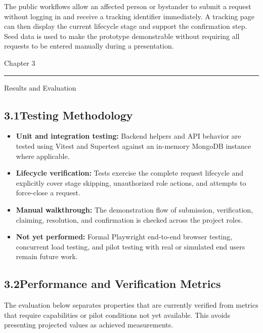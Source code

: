 \documentclass[11pt,a4paper]{article}
\newcommand{\chaptertitle}[2]{%
  \vspace*{0pt}%
  {\normalfont\fontsize{22}{25}\selectfont #1\par}%
  \vspace{2pt}%
  \noindent\rule{\textwidth}{0.7pt}\par
  \vspace{7pt}%
  {\normalfont\fontsize{22}{25}\selectfont #2\par}
  \vspace{5pt}%
}
\begin{document}
The public workflows allow an affected person or bystander to submit a request without logging in and receive a tracking identifier immediately. A tracking page can then display the current lifecycle stage and support the confirmation step. Seed data is used to make the prototype demonstrable without requiring all requests to be entered manually during a presentation.

\newpage

\chaptertitle{Chapter 3}{Results and Evaluation}

\subsection{3.1\quad Testing Methodology}

\begin{itemize}
\item \textbf{Unit and integration testing:} Backend helpers and API behavior are tested using Vitest and Supertest against an in-memory MongoDB instance where applicable.
\item \textbf{Lifecycle verification:} Tests exercise the complete request lifecycle and explicitly cover stage skipping, unauthorized role actions, and attempts to force-close a request.
\item \textbf{Manual walkthrough:} The demonstration flow of submission, verification, claiming, resolution, and confirmation is checked across the project roles.
\item \textbf{Not yet performed:} Formal Playwright end-to-end browser testing, concurrent load testing, and pilot testing with real or simulated end users remain future work.
\end{itemize}

\subsection{3.2\quad Performance and Verification Metrics}

The evaluation below separates properties that are currently verified from metrics that require capabilities or pilot conditions not yet available. This avoids presenting projected values as achieved measurements.
\end{document}
